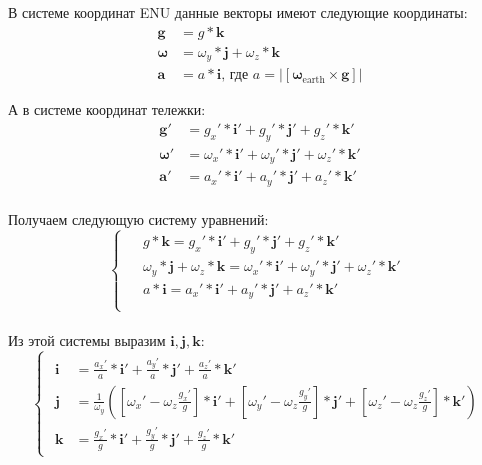 В системе координат ENU данные векторы имеют следующие координаты:
\begin{align*}
	\bm{g} &= g * \bm{k} \\
	\bm{\omega} &= \omega_{y} * \bm{j} + \omega_{z} * \bm{k} \\
	\bm{a} &= a * \bm{i} \text{,\ \ \ \ где $a = \left| \left[ \bm{\omega}_{\text{earth}} \times \bm{g} \right] \right| $}
\end{align*}


А в системе координат тележки:
\begin{align*}
	\bm{g}' &= g_{x}' * \bm{i}' + g_{y}' * \bm{j}' + g_{z}' * \bm{k}' \\
	\bm{\omega}' &= \omega_{x}' * \bm{i}' + \omega_{y}' * \bm{j}' + \omega_{z}' * \bm{k}' \\
	\bm{a}' &= a_{x}' * \bm{i}' + a_{y}' * \bm{j}' + a_{z}' * \bm{k}' \\
\end{align*}


Получаем следующую систему уравнений:
\[
\begin{cases}
	\begin{aligned}
		&g * \bm{k} = g_{x}' * \bm{i}' + g_{y}' * \bm{j}' + g_{z}' * \bm{k}' \\
		&\omega_{y} * \bm{j} + \omega_{z} * \bm{k} = \omega_{x}' * \bm{i}' + \omega_{y}' * \bm{j}' + \omega_{z}' * \bm{k}' \\
		&a * \bm{i} = a_{x}' * \bm{i}' + a_{y}' * \bm{j}' + a_{z}' * \bm{k}' \\
	\end{aligned}
\end{cases}
\] \\


Из этой системы выразим $\bm{i}, \bm{j}, \bm{k}$:
\[
\begin{cases}
	\begin{aligned}
		\bm{i} &= \frac{a_{x}'}{a} * \bm{i}' + \frac{a_{y}'}{a} * \bm{j}' + \frac{a_{z}'}{a} * \bm{k}' \\
		\bm{j} &= \frac{1}{\omega_{y}}
		\left(
		\left[ \omega_{x}' - \omega_{z} \frac{g_{x}'}{g} \right] * \bm{i}' +
		\left[ \omega_{y}' - \omega_{z} \frac{g_{y}'}{g} \right] * \bm{j}' +
		\left[ \omega_{z}' - \omega_{z} \frac{g_{z}'}{g} \right] * \bm{k}'
		\right) \\
		\bm{k} &= \frac{g_{x}'}{g} * \bm{i}' + \frac{g_{y}'}{g} * \bm{j}' + \frac{g_{z}'}{g} * \bm{k}'
	\end{aligned}
\end{cases}
\] \\


